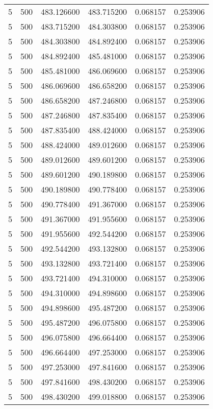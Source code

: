 \begin{longtable}{rrrrrr}
5 & 500 & 483.126600 & 483.715200 & 0.068157 & 0.253906 \\
5 & 500 & 483.715200 & 484.303800 & 0.068157 & 0.253906 \\
5 & 500 & 484.303800 & 484.892400 & 0.068157 & 0.253906 \\
5 & 500 & 484.892400 & 485.481000 & 0.068157 & 0.253906 \\
5 & 500 & 485.481000 & 486.069600 & 0.068157 & 0.253906 \\
5 & 500 & 486.069600 & 486.658200 & 0.068157 & 0.253906 \\
5 & 500 & 486.658200 & 487.246800 & 0.068157 & 0.253906 \\
5 & 500 & 487.246800 & 487.835400 & 0.068157 & 0.253906 \\
5 & 500 & 487.835400 & 488.424000 & 0.068157 & 0.253906 \\
5 & 500 & 488.424000 & 489.012600 & 0.068157 & 0.253906 \\
5 & 500 & 489.012600 & 489.601200 & 0.068157 & 0.253906 \\
5 & 500 & 489.601200 & 490.189800 & 0.068157 & 0.253906 \\
5 & 500 & 490.189800 & 490.778400 & 0.068157 & 0.253906 \\
5 & 500 & 490.778400 & 491.367000 & 0.068157 & 0.253906 \\
5 & 500 & 491.367000 & 491.955600 & 0.068157 & 0.253906 \\
5 & 500 & 491.955600 & 492.544200 & 0.068157 & 0.253906 \\
5 & 500 & 492.544200 & 493.132800 & 0.068157 & 0.253906 \\
5 & 500 & 493.132800 & 493.721400 & 0.068157 & 0.253906 \\
5 & 500 & 493.721400 & 494.310000 & 0.068157 & 0.253906 \\
5 & 500 & 494.310000 & 494.898600 & 0.068157 & 0.253906 \\
5 & 500 & 494.898600 & 495.487200 & 0.068157 & 0.253906 \\
5 & 500 & 495.487200 & 496.075800 & 0.068157 & 0.253906 \\
5 & 500 & 496.075800 & 496.664400 & 0.068157 & 0.253906 \\
5 & 500 & 496.664400 & 497.253000 & 0.068157 & 0.253906 \\
5 & 500 & 497.253000 & 497.841600 & 0.068157 & 0.253906 \\
5 & 500 & 497.841600 & 498.430200 & 0.068157 & 0.253906 \\
5 & 500 & 498.430200 & 499.018800 & 0.068157 & 0.253906 \\

\end{longtable}
